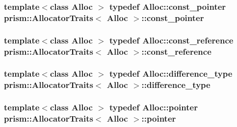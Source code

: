\subsubsection[{\texorpdfstring{const\+\_\+pointer}{const_pointer}}]{\setlength{\rightskip}{0pt plus 5cm}template$<$class Alloc $>$ typedef Alloc\+::const\+\_\+pointer {\bf prism\+::\+Allocator\+Traits}$<$ Alloc $>$\+::{\bf const\+\_\+pointer}}\hypertarget{structprism_1_1_allocator_traits_ae9bcf74e2770e54eb99f29edfce5f81e}{}\label{structprism_1_1_allocator_traits_ae9bcf74e2770e54eb99f29edfce5f81e}
\subsubsection[{\texorpdfstring{const\+\_\+reference}{const_reference}}]{\setlength{\rightskip}{0pt plus 5cm}template$<$class Alloc $>$ typedef Alloc\+::const\+\_\+reference {\bf prism\+::\+Allocator\+Traits}$<$ Alloc $>$\+::{\bf const\+\_\+reference}}\hypertarget{structprism_1_1_allocator_traits_a5054d2fa3ac8a0a1d6d1885143107963}{}\label{structprism_1_1_allocator_traits_a5054d2fa3ac8a0a1d6d1885143107963}
\subsubsection[{\texorpdfstring{difference\+\_\+type}{difference_type}}]{\setlength{\rightskip}{0pt plus 5cm}template$<$class Alloc $>$ typedef Alloc\+::difference\+\_\+type {\bf prism\+::\+Allocator\+Traits}$<$ Alloc $>$\+::{\bf difference\+\_\+type}}\hypertarget{structprism_1_1_allocator_traits_a8cb6d0ad1c318af0984ce70b71b4f459}{}\label{structprism_1_1_allocator_traits_a8cb6d0ad1c318af0984ce70b71b4f459}
\subsubsection[{\texorpdfstring{pointer}{pointer}}]{\setlength{\rightskip}{0pt plus 5cm}template$<$class Alloc $>$ typedef Alloc\+::pointer {\bf prism\+::\+Allocator\+Traits}$<$ Alloc $>$\+::{\bf pointer}}\hypertarget{structprism_1_1_allocator_traits_aed8a12c05f82e96f45db30e9511fa62d}{}\label{structprism_1_1_allocator_traits_aed8a12c05f82e96f45db30e9511fa62d}
